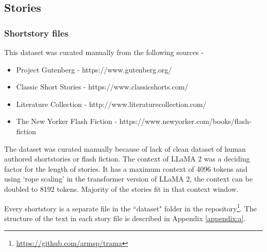 \documentclass[11pt]{article}
\begin{document}
\subsection{Stories}

\subsubsection{Shortstory files}
This dataset was curated manually from the following sources - 
\begin{itemize}
  \item Project Gutenberg - https://www.gutenberg.org/
  \item Classic Short Stories - https://www.classicshorts.com/
  \item Literature Collection - http://www.literaturecollection.com/
  \item The New Yorker Flash Fiction - https://www.newyorker.com/books/flash-fiction
\end{itemize}
The dataset was curated manually because of lack of clean dataset of human authored shortstories or flash fiction. The context of LLaMA 2 was a deciding factor for the length of stories. It has a maximum context of 4096 tokens and using `rope scaling' in the transformer version of LLaMA 2, the context can be doubled to 8192 tokens. Majority of the stories fit in that context window.

Every shortstory is a separate file in the ``dataset" folder in the repository\footnote[3]{\url{https://github.com/armsp/trama}}. The structure of the text in each story file is described in Appendix \ref{appendix:a}.
\end{document}
